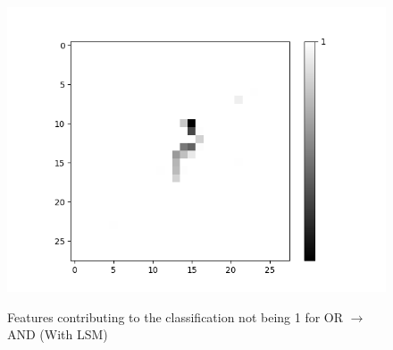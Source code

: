 \begin{figure}[H]
\begin{minipage}[b]{0.19\textwidth}
	\includegraphics[width=\textwidth]{OR-AND(W-LSM)(1)/DontLike/False/Layer0-Neuron-28.png}
	\label{}
\end{minipage}
	\caption{Features contributing to the classification not being 1 for OR $\rightarrow$ AND (With LSM)}
	\hfill
\end{figure}
